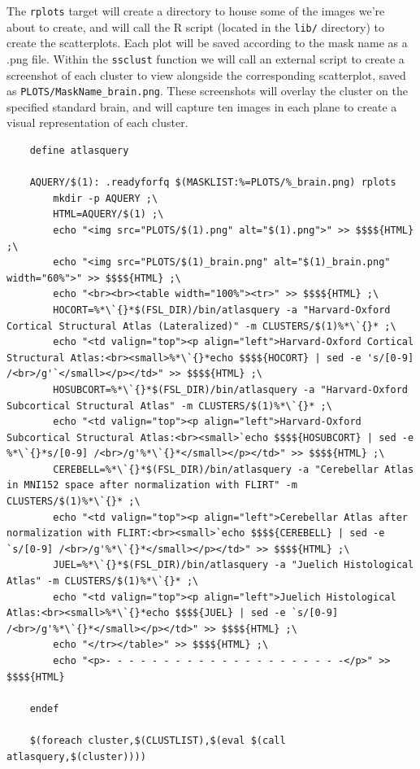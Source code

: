 The \texttt{rplots} target will create a directory to house some of the images we're about to create, and will call the R script (located in the \texttt{lib/} directory) to create the scatterplots. Each plot will be saved according to the mask name as a .png file.  Within the \texttt{ssclust} function we will call an external script to create a screenshot of each cluster to view alongside the corresponding scatterplot, saved as \texttt{PLOTS/MaskName_brain.png}. These screenshots will overlay the cluster on the specified standard brain, and will capture ten images in each plane to create a visual representation of each cluster.

\begin{lstlisting}
	define atlasquery
	
	AQUERY/$(1): .readyforfq $(MASKLIST:%=PLOTS/%_brain.png) rplots
		mkdir -p AQUERY ;\
		HTML=AQUERY/$(1) ;\
		echo "<img src="PLOTS/$(1).png" alt="$(1).png">" >> $$$${HTML} ;\
		echo "<img src="PLOTS/$(1)_brain.png" alt="$(1)_brain.png" width="60%">" >> $$$${HTML} ;\
		echo "<br><br><table width="100%"><tr>" >> $$$${HTML} ;\
		HOCORT=%*\`{}*$(FSL_DIR)/bin/atlasquery -a "Harvard-Oxford Cortical Structural Atlas (Lateralized)" -m CLUSTERS/$(1)%*\`{}* ;\
		echo "<td valign="top"><p align="left">Harvard-Oxford Cortical Structural Atlas:<br><small>%*\`{}*echo $$$${HOCORT} | sed -e 's/[0-9] /<br>/g'`</small></p></td>" >> $$$${HTML} ;\
		HOSUBCORT=%*\`{}*$(FSL_DIR)/bin/atlasquery -a "Harvard-Oxford Subcortical Structural Atlas" -m CLUSTERS/$(1)%*\`{}* ;\
		echo "<td valign="top"><p align="left">Harvard-Oxford Subcortical Structural Atlas:<br><small>`echo $$$${HOSUBCORT} | sed -e %*\`{}*s/[0-9] /<br>/g'%*\`{}*</small></p></td>" >> $$$${HTML} ;\
		CEREBELL=%*\`{}*$(FSL_DIR)/bin/atlasquery -a "Cerebellar Atlas in MNI152 space after normalization with FLIRT" -m CLUSTERS/$(1)%*\`{}* ;\
		echo "<td valign="top"><p align="left">Cerebellar Atlas after normalization with FLIRT:<br><small>`echo $$$${CEREBELL} | sed -e `s/[0-9] /<br>/g'%*\`{}*</small></p></td>" >> $$$${HTML} ;\
		JUEL=%*\`{}*$(FSL_DIR)/bin/atlasquery -a "Juelich Histological Atlas" -m CLUSTERS/$(1)%*\`{}* ;\
		echo "<td valign="top"><p align="left">Juelich Histological Atlas:<br><small>%*\`{}*echo $$$${JUEL} | sed -e `s/[0-9] /<br>/g'%*\`{}*</small></p></td>" >> $$$${HTML} ;\
		echo "</tr></table>" >> $$$${HTML} ;\
		echo "<p>- - - - - - - - - - - - - - - - - - - - -</p>" >> $$$${HTML}
				
	endef
	
	$(foreach cluster,$(CLUSTLIST),$(eval $(call atlasquery,$(cluster))))
\end{lstlisting}

